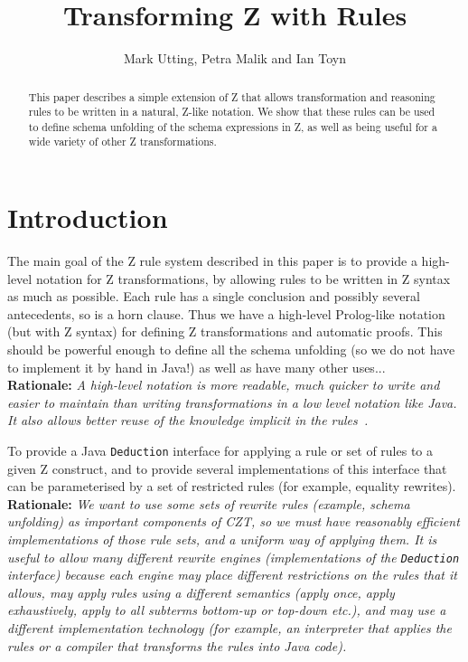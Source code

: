 \documentclass{article}
\title{Transforming Z with Rules}
\author{Mark Utting, Petra Malik and Ian Toyn}
\newenvironment{Rationale}{\\ \textbf{Rationale:}\it}{}
\begin{document}
\maketitle

\begin{abstract}
This paper describes a simple extension of Z that allows transformation and
reasoning rules to be written in a natural, Z-like notation.  We show that
these rules can be used to define schema unfolding of the schema
expressions in Z, as well as being useful for a wide variety of other Z
transformations.
\end{abstract}

\section{Introduction}

The main goal of the Z rule system described in this paper is
to provide a high-level notation for Z transformations, by
allowing rules to be written in Z syntax as much as possible.  Each
rule has a single conclusion and possibly several antecedents, so is a
horn clause.  Thus we have a high-level Prolog-like notation (but with
Z syntax) for defining Z transformations and automatic proofs.  This
should be powerful enough to define all the schema unfolding (so we do
not have to implement it by hand in Java!) as well as have many other
uses...
  \begin{Rationale}
    A high-level notation is more readable, much quicker
    to write and easier to maintain than writing transformations in
    a low level notation like Java.  It also allows better reuse of the
    knowledge implicit in the rules~\cite{DenningACM}.
  \end{Rationale}

To provide a Java \texttt{Deduction} interface for applying a rule or
set of rules to a given Z construct, and to provide several
implementations of this interface that can be parameterised by a set
of restricted rules (for example, equality rewrites).
  \begin{Rationale} 
  We want to use some sets of rewrite rules
  (example, schema unfolding) as important components of CZT, so we
  must have reasonably efficient implementations of those rule sets,
  and a uniform way of applying them.  It is useful to allow many
  different rewrite engines (implementations of the \texttt{Deduction}
  interface) because each engine may place different restrictions on
  the rules that it allows, may apply rules using a different
  semantics (apply once, apply exhaustively, apply to all subterms
  bottom-up or top-down etc.), and may use a different implementation
  technology (for example, an interpreter that applies the rules or a
  compiler that transforms the rules into Java code).
  \end{Rationale}
\end{document}
